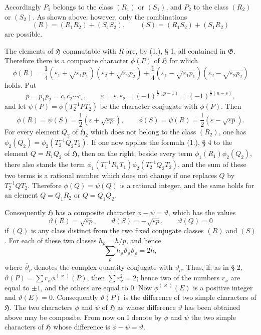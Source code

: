 \documentclass[11pt]{article}
\newcommand{\Hgr}{\mathfrak{H}}
\newcommand{\Ggr}{\mathfrak{G}}
\newcommand{\eps}{\varepsilon}
\begin{document}
Accordingly $P_1$ belongs to the class $(R_1)$ or $(S_1)$, and $P_2$ to the class $(R_2)$ or $(S_2)$. As shown above, however, only the combinations
\[
 (R)=(R_1R_2)+(S_1S_2),	\qquad (S)=(R_1S_2)+(S_1R_2)
\]
are possible.

The elements of $\Hgr$ commutable with $R$ are, by (1.), § 1, all contained in $\Ggr$. Therefore there is a composite character $\phi(P)$ of $\Hgr$ for which
\[
 \phi(R)=\frac14(\eps_1+\sqrt{\eps_1p_1})(\eps_2+\sqrt{\eps_2p_2})+\frac14(\eps_1-\sqrt{\eps_1p_1})(\eps_2-\sqrt{\eps_2p_2})
\]
holds. Put
\[
 p=p_1p_2=c_1c_2\cdots c_s,	\qquad \eps=\eps_1\eps_2=(-1)^{\frac12(p-1)}=(-1)^{\frac12(n-s)},
\]
and let $\psi(P)=\phi(T_2^{-1}PT_2)$ be the character conjugate with $\phi(P)$. Then
\[
 \phi(R)=\psi(S)=\frac12(\eps+\sqrt{\eps p}),	\qquad \phi(S)=\psi(R)=\frac12(\eps-\sqrt{\eps p}).
\]
For every element $Q_2$ of $\Hgr_2$ which does not belong to the class $(R_2)$, one has $\phi_2(Q_2)=\phi_2(T_2^{-1}Q_2T_2)$. If one now applies the formula (1.), § 4 to the element $Q=R_1Q_2$ of $\Hgr$, then on the right, beside every term $\phi_1(R_1)\phi_2(Q_2)$, there also stands the term $\phi_1(T_1^{-1}R_1T_1)\phi_2(T_2^{-1}Q_2T_2)$, and the sum of these two terms is a rational number which does not change if one replaces $Q$ by $T_2^{-1}QT_2$. Therefore $\phi(Q)=\psi(Q)$ is a rational integer, and the same holds for an element $Q=Q_1R_2$ or $Q=Q_1Q_2$.

Consequently $\Hgr$ has a composite character $\phi-\psi=\vartheta$, which has the values
\begin{equation}\tag{1.}
 \vartheta(R)=\sqrt{\eps p},\qquad \vartheta(S)=-\sqrt{\eps p},\qquad \vartheta(Q)=0
\end{equation}
if $(Q)$ is any class distinct from the two fixed conjugate classes $(R)$ and $(S)$. For each of these two classes $h_\rho=h/p$, and hence
\[
 \sum_\rho h_\rho\vartheta_\rho\overline{\vartheta}_\rho=2h,
\]
where $\overline{\vartheta}_\rho$ denotes the complex quantity conjugate with $\vartheta_\rho$. Thus, if, as in § 2, $\vartheta(P)=\sum r_\varkappa\phi^{(\varkappa)}(P)$, then $\sum r_\varkappa^2=2$; hence two of the numbers $r_\varkappa$ are equal to $\pm1$, and the others are equal to $0$. Now $\phi^{(\varkappa)}(E)$ is a positive integer and $\vartheta(E)=0$. Consequently $\vartheta(P)$ is the difference of two simple characters of $\Hgr$. The two characters $\phi$ and $\psi$ of $\Hgr$ as whose difference $\vartheta$ has been obtained above may be composite. From now on I denote by $\phi$ and $\psi$ the two simple characters of $\Hgr$ whose difference is $\phi-\psi=\vartheta$.
\end{document}
